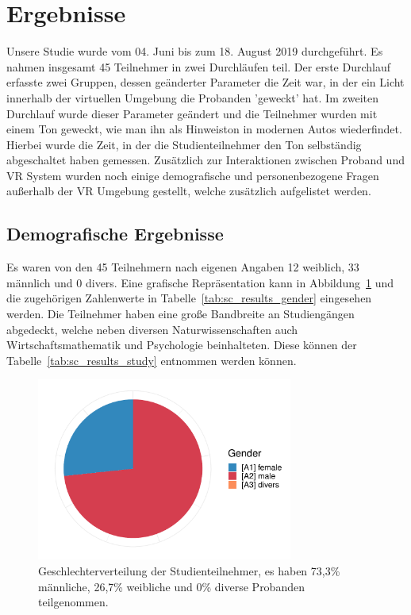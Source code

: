\section{Ergebnisse}

Unsere Studie wurde vom 04. Juni bis zum 18. August 2019 durchgeführt. Es nahmen insgesamt 45 Teilnehmer in zwei Durchläufen teil. Der erste Durchlauf erfasste zwei Gruppen, dessen geänderter Parameter die Zeit war, in der ein Licht innerhalb der virtuellen Umgebung die Probanden 'geweckt' hat. Im zweiten Durchlauf wurde dieser Parameter geändert und die Teilnehmer wurden mit einem Ton geweckt, wie man ihn als Hinweiston in modernen Autos wiederfindet. Hierbei wurde die Zeit, in der die Studienteilnehmer den Ton selbständig abgeschaltet haben gemessen. Zusätzlich zur Interaktionen zwischen Proband und VR System wurden noch einige demografische und personenbezogene Fragen außerhalb der VR Umgebung gestellt, welche zusätzlich aufgelistet werden.

\subsection{Demografische Ergebnisse}

Es waren von den 45 Teilnehmern nach eigenen Angaben 12 weiblich, 33 männlich und 0 divers. Eine grafische Repräsentation kann in Abbildung~\ref{fig:gender} und die zugehörigen Zahlenwerte in Tabelle~\ref{tab:sc_results_gender} eingesehen werden. Die Teilnehmer haben eine große Bandbreite an Studiengängen abgedeckt, welche neben diversen Naturwissenschaften auch Wirtschaftsmathematik und Psychologie beinhalteten. Diese können der Tabelle~\ref{tab:sc_results_study} entnommen werden können.

\begin{figure}[H]
	\centering
	\includegraphics[width=0.75\textwidth]{./_StudyResults/gender}
	\caption{Geschlechterverteilung der Studienteilnehmer, es haben 73,3\% männliche, 26,7\% weibliche und 0\% diverse Probanden teilgenommen.}
	\label{fig:gender}
\end{figure}

